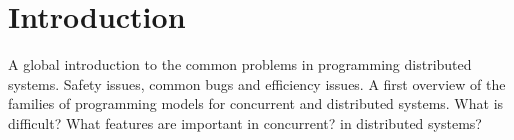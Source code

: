 \section{Introduction}\label{Introduction}
A global introduction to the common problems in programming distributed systems. Safety 
issues, common bugs and efficiency issues. A first overview of the families of 
programming models for concurrent and distributed systems. What is difficult? What 
features are important in concurrent? in distributed systems?